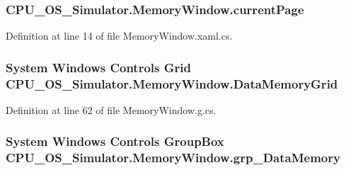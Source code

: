 \subsubsection[{current\+Page}]{ C\+P\+U\+\_\+\+O\+S\+\_\+\+Simulator.\+Memory\+Window.\+current\+Page\hspace{0.3cm}{\ttfamily [private]}}\label{class_c_p_u___o_s___simulator_1_1_memory_window_ae1b974c8b976e19dde1a5491e3fe0e37}


Definition at line 14 of file Memory\+Window.\+xaml.\+cs.

\hypertarget{class_c_p_u___o_s___simulator_1_1_memory_window_a93e699c04992f66b92f0d3b834f267d1}{}
\subsubsection[{Data\+Memory\+Grid}]{\setlength{\rightskip}{0pt plus 5cm}System Windows Controls Grid C\+P\+U\+\_\+\+O\+S\+\_\+\+Simulator.\+Memory\+Window.\+Data\+Memory\+Grid\hspace{0.3cm}{\ttfamily [package]}}\label{class_c_p_u___o_s___simulator_1_1_memory_window_a93e699c04992f66b92f0d3b834f267d1}


Definition at line 62 of file Memory\+Window.\+g.\+cs.

\hypertarget{class_c_p_u___o_s___simulator_1_1_memory_window_a283493c20704b70efe355621cd6e5aa4}{}
\subsubsection[{grp\+\_\+\+Data\+Memory}]{\setlength{\rightskip}{0pt plus 5cm}System Windows Controls Group\+Box C\+P\+U\+\_\+\+O\+S\+\_\+\+Simulator.\+Memory\+Window.\+grp\+\_\+\+Data\+Memory\hspace{0.3cm}{\ttfamily [package]}}\label{class_c_p_u___o_s___simulator_1_1_memory_window_a283493c20704b70efe355621cd6e5aa4}


